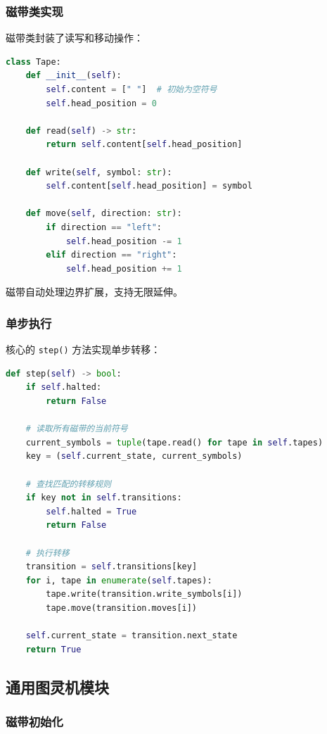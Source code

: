 \documentclass{sysucseexp}
\begin{document}
\subsubsection{磁带类实现}

磁带类封装了读写和移动操作：

\begin{lstlisting}[language=Python]
class Tape:
    def __init__(self):
        self.content = [" "]  # 初始为空符号
        self.head_position = 0
    
    def read(self) -> str:
        return self.content[self.head_position]
    
    def write(self, symbol: str):
        self.content[self.head_position] = symbol
    
    def move(self, direction: str):
        if direction == "left":
            self.head_position -= 1
        elif direction == "right":
            self.head_position += 1
\end{lstlisting}

磁带自动处理边界扩展，支持无限延伸。

\subsubsection{单步执行}

核心的 \texttt{step()} 方法实现单步转移：

\begin{lstlisting}[language=Python]
def step(self) -> bool:
    if self.halted:
        return False
    
    # 读取所有磁带的当前符号
    current_symbols = tuple(tape.read() for tape in self.tapes)
    key = (self.current_state, current_symbols)
    
    # 查找匹配的转移规则
    if key not in self.transitions:
        self.halted = True
        return False
    
    # 执行转移
    transition = self.transitions[key]
    for i, tape in enumerate(self.tapes):
        tape.write(transition.write_symbols[i])
        tape.move(transition.moves[i])
    
    self.current_state = transition.next_state
    return True
\end{lstlisting}

\subsection{通用图灵机模块}

\subsubsection{磁带初始化}
\end{document}
